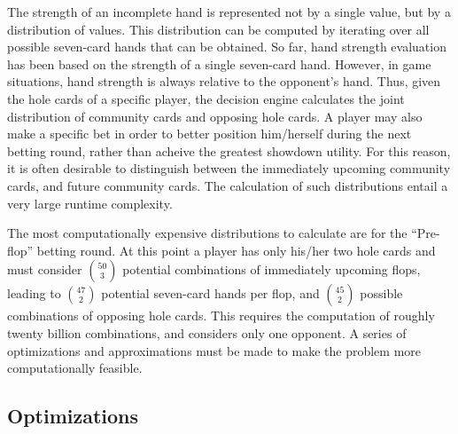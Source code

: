 The strength of an incomplete hand is represented not by a single value, but by a distribution of values.
This distribution can be computed by iterating over all possible seven-card hands that can be obtained.%
So far, hand strength evaluation has been based on the strength of a single seven-card hand.
However, in game situations, hand strength is always relative to the opponent's hand.
Thus, given the hole cards of a specific player, the decision engine calculates the joint distribution of community cards and opposing hole cards.
A player may also make a specific bet in order to better position him/herself during the next betting round, rather than acheive the greatest showdown utility.
For this reason, it is often desirable to distinguish between the immediately upcoming community cards, and future community cards.
The calculation of such distributions entail a very large runtime complexity.

The most computationally expensive distributions to calculate are for the ``Pre-flop'' betting round.
At this point a player has only his/her two hole cards and must consider $\binom{50}{3}$ potential combinations of immediately upcoming flops, leading to $\binom{47}{2}$ potential seven-card hands per flop, and $\binom{45}{2}$ possible combinations of opposing hole cards.
This requires the computation of roughly twenty billion combinations, and considers only one opponent.
A series of optimizations and approximations must be made to make the problem more computationally feasible. %

\subsection{Optimizations}
\label{sec:Optimizations}

